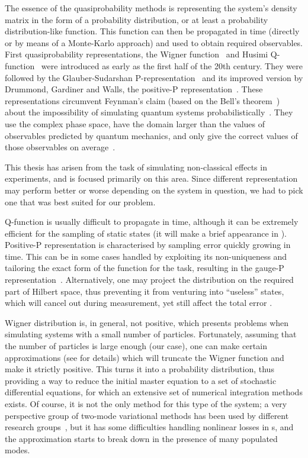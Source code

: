 The essence of the quasiprobability methods is representing the system's density matrix in the form of a probability distribution, or at least a probability distribution-like function.
This function can then be propagated in time (directly or by means of a Monte-Karlo approach) and used to obtain required observables.
First quasiprobability representations, the Wigner function~\cite{Wigner1932,Dirac1945,Moyal1947} and Husimi Q-function~\cite{Husimi1940} were introduced as early as the first half of the 20th century.
They were followed by the Glauber-Sudarshan P-representation~\cite{Sudarshan1963,Glauber1963b,Glauber1963} and its improved version by Drummond, Gardiner and Walls, the positive-P representation~\cite{Drummond1980,Drummond1981}.
These representations circumvent Feynman's claim (based on the Bell's theorem~\cite{Bell1964}) about the impossibility of simulating quantum systems probabilistically~\cite{Feynman1982}.
They use the complex phase space, have the domain larger than the values of observables predicted by quantum mechanics, and only give the correct values of those observables on average~\cite{Reid2013}.

This thesis has arisen from the task of simulating non-classical effects in  experiments, and is focused primarily on this area.
Since different representation may perform better or worse depending on the system in question, we had to pick one that was best suited for our problem.

Q-function is usually difficult to propagate in time, although it can be extremely efficient for the sampling of static states (it will make a brief appearance in ).
Positive-P representation is characterised by sampling error quickly growing in time.
This can be in some cases handled by exploiting its non-uniqueness and tailoring the exact form of the function for the task, resulting in the gauge-P representation~\cite{Deuar2002}.
Alternatively, one may project the distribution on the required part of Hilbert space, thus preventing it from venturing into ``useless'' states, which will cancel out during measurement, yet still affect the total error .

Wigner distribution is, in general, not positive, which presents problems when simulating systems with a small number of particles.
Fortunately, assuming that the number of particles is large enough (our case), one can make certain approximations (see  for details) which will truncate the Wigner function and make it strictly positive.
This turns it into a probability distribution, thus providing a way to reduce the initial master equation to a set of stochastic differential equations, for which an extensive set of numerical integration methods exists.
Of course, it is not the only method for this type of the system; a very perspective group of two-mode variational methods has been used by different research groups~\cite{Li2008,Li2009,Sinatra2011},
but it has some difficulties handling nonlinear losses in s, and the approximation starts to break down in the presence of many populated modes.

